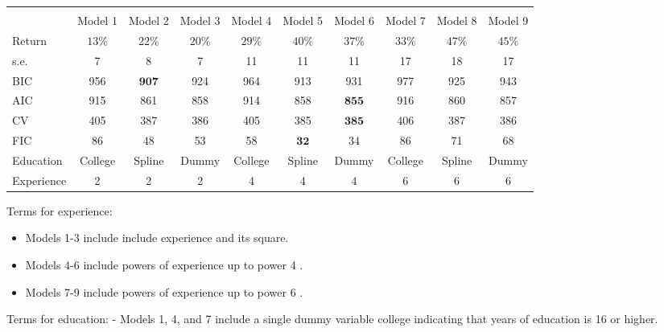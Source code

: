 \documentclass[10pt]{article}
\begin{document}
\begin{tabular}{lccccccccc}
\hline\hline
 &  &  &  &  &  &  &  &  &  \\
 & Model 1 & Model 2 & Model 3 & Model 4 & Model 5 & Model 6 & Model 7 & Model 8 & Model 9 \\
\cline { 2 - 10 }
Return & $13 \%$ & $22 \%$ & $20 \%$ & $29 \%$ & $40 \%$ & $37 \%$ & $33 \%$ & $47 \%$ & $45 \%$ \\
s.e. & 7 & 8 & 7 & 11 & 11 & 11 & 17 & 18 & 17 \\
BIC & 956 & $\mathbf{9 0 7}$ & 924 & 964 & 913 & 931 & 977 & 925 & 943 \\
AIC & 915 & 861 & 858 & 914 & 858 & $\mathbf{8 5 5}$ & 916 & 860 & 857 \\
CV & 405 & 387 & 386 & 405 & 385 & $\mathbf{3 8 5}$ & 406 & 387 & 386 \\
FIC & 86 & 48 & 53 & 58 & $\mathbf{3 2}$ & 34 & 86 & 71 & 68 \\
Education & College & Spline & Dummy & College & Spline & Dummy & College & Spline & Dummy \\
Experience & 2 & 2 & 2 & 4 & 4 & 4 & 6 & 6 & 6 \\
\end{tabular}

Terms for experience:

\begin{itemize}
  \item Models 1-3 include include experience and its square.

  \item Models 4-6 include powers of experience up to power 4 .

  \item Models 7-9 include powers of experience up to power 6 .

\end{itemize}
Terms for education: - Models 1, 4, and 7 include a single dummy variable college indicating that years of education is 16 or higher.
\end{document}
